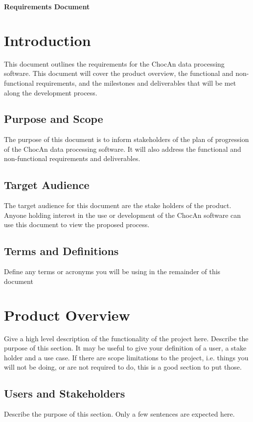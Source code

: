 \documentclass{article}
\renewcommand{\maketitle}{
   \begin{center}
      {\Huge \bfseries Requirements Document}
   \end{center}
}
\begin{document}
\maketitle
\tableofcontents

\section{Introduction}
This document outlines the requirements for the ChocAn data processing software. This document will cover the product overview, the functional and non-functional requirements, and the milestones and deliverables that will be met along the development process.

\subsection{Purpose and Scope}
The purpose of this document is to inform stakeholders of the plan of progression of the ChocAn data processing software. It will also address the functional and non-functional requirements and deliverables.

\subsection{Target Audience}
The target audience for this document are the stake holders of the product. Anyone holding interest in the use or development of the ChocAn software can use this document to view the proposed process.

\subsection{Terms and Definitions}
Define any terms or acronyms you will be using in the remainder of this document

\section{Product Overview}
Give a high level description of the functionality of the project here. Describe the purpose of this section. It may be useful to give your definition of a user, a stake holder and a use case. If there are scope limitations to the project, i.e. things you will not be doing, or are not required to do, this is a good section to put those.

\subsection{Users and Stakeholders}
Describe the purpose of this section. Only a few sentences are expected here.
\end{document}
